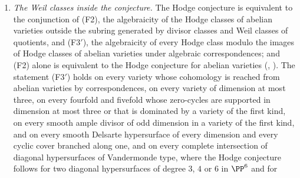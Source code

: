 \begin{theorem}[Closure]
\begin{enumerate}[label=\textup{(\roman*)},leftmargin=2.8em,itemsep=4pt]
\begin{enumerate}[label=\textup{(\alph*)},nosep,leftmargin=2.2em]
    one whose ideal sheaf is presented by two bundles
    with classes in the subring generated by line bundles unless
    $d\equiv15,23\pmod{24}$ (\cite[Corollary~4.68]{paperII},
    \cite[Corollary~4.84]{paperII});
  \item a representative of the Weil $K$-theory class that is a locally free
    sheaf on a smooth germ of codimension at least two of its support, or
    whose support has codimension at least $n$ (\cite[Theorem~2.5]{paperII},
    \cite[Theorem~2.13]{paperII});
  \item at a quartic CM field, a complex with secant character that is
    locally free on a smooth curve at some point, in particular the explicit
    pair of \cite[Example~11.2.7]{Mar25c} (\cite[Theorem~5.28]{paperII},
    \cite[Corollary~5.30]{paperII});
  \item a convolution of fewer than $2n$ line bundles with nondegenerate
    differences (\cite[Theorem~4.26]{paperII}); on $E_{0}^{6}$, every convolution
    of the Weil pieces with three multiples of the polarisation, and on
    $E_{0}^{8}$ every one whose pieces have their shifts within six
    consecutive values (\cite[Theorem~4.35]{paperII}, \cite[Corollary~4.48]{paperII}).
  \end{enumerate}
\item \enlargethispage{4pt}\emph{The Weil classes inside the conjecture.} The Hodge conjecture is
  equivalent to the conjunction of \textup{(F2)}, the algebraicity of the
  Hodge classes of abelian varieties outside the subring generated by divisor
  classes and Weil classes of quotients, and \textup{(F3$'$)}, the
  algebraicity of every Hodge class modulo the images of Hodge classes of
  abelian varieties under algebraic correspondences; and \textup{(F2)} alone
  is equivalent to the Hodge conjecture for abelian varieties
  (, ). The statement \textup{(F3$'$)}
  holds on every variety whose cohomology is reached from abelian varieties by
  correspondences, on every variety of dimension at most three, on every
  fourfold and fivefold whose zero-cycles are supported in dimension at most
  three or that is dominated by a variety of the first kind, on every smooth
  ample divisor of odd dimension in a variety of the first kind, and on every
  smooth Delsarte hypersurface of every dimension and every cyclic cover
  branched along one, and on every complete intersection of diagonal
  hypersurfaces of Vandermonde type, where the Hodge conjecture follows for
  two diagonal hypersurfaces of degree $3$, $4$ or $6$ in $\PP^{6}$ and for

\end{enumerate}
\end{theorem}
